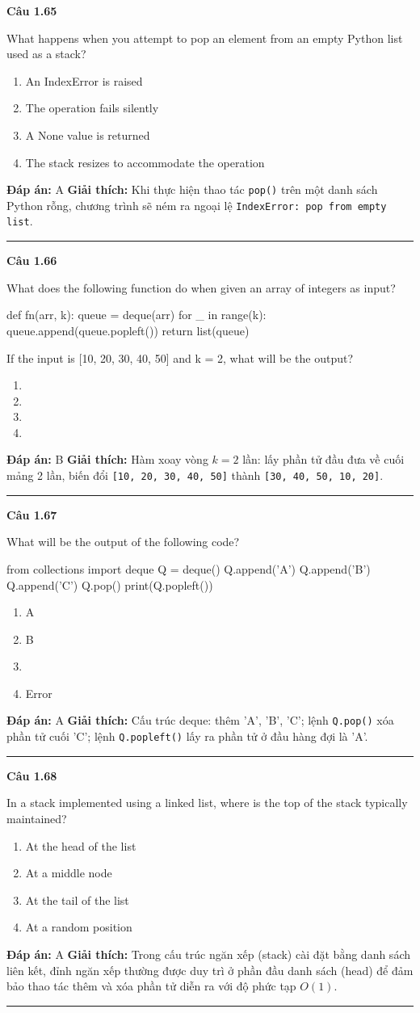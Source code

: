 \documentclass[11pt,a4paper]{article}
\newenvironment{question}[1]{%
  \par\vspace{1em}\noindent\textbf{\large Câu #1}\par\vspace{0.4em}
}{%
  \par\vspace{1em}\hrule\vspace{0.6em}
}
\newenvironment{choices}{%
  \begin{enumerate}[label=\textbf{\Alph*.},leftmargin=2.2em,itemsep=2pt,topsep=3pt]
}{%
  \end{enumerate}
}
\newcommand{\choice}{\item}
\newenvironment{codebox}{%
  \begin{tcolorbox}[colback=gray!8!white,colframe=gray!50!black,arc=1.5mm,boxrule=0.6pt,left=3mm,right=3mm,top=2.5mm,bottom=2.5mm]
  \ttfamily\small
}{%
  \end{tcolorbox}
}
\begin{document}
\begin{question}{1.65}
What happens when you attempt to pop an element from an empty Python list used as a stack?
\begin{choices}
\choice An IndexError is raised
\choice The operation fails silently
\choice A None value is returned
\choice The stack resizes to accommodate the operation
\end{choices}
\textbf{Đáp án:} A
\textbf{Giải thích:} Khi thực hiện thao tác \texttt{pop()} trên một danh sách Python rỗng, chương trình sẽ ném ra ngoại lệ \texttt{IndexError: pop from empty list}.
\end{question}

\begin{question}{1.66}
What does the following function do when given an array of integers as input?
\begin{codebox}
def fn(arr, k):
    queue = deque(arr)
    for _ in range(k):
        queue.append(queue.popleft())
    return list(queue)
\end{codebox}
If the input is [10, 20, 30, 40, 50] and k = 2, what will be the output?
\begin{choices}
\choice [40, 50, 10, 20, 30]
\choice [30, 40, 50, 10, 20]
\choice [20, 30, 40, 50, 10]
\choice [50, 10, 20, 30, 40]
\end{choices}
\textbf{Đáp án:} B
\textbf{Giải thích:} Hàm xoay vòng $k = 2$ lần: lấy phần tử đầu đưa về cuối mảng 2 lần, biến đổi \texttt{[10, 20, 30, 40, 50]} thành \texttt{[30, 40, 50, 10, 20]}.
\end{question}

\begin{question}{1.67}
What will be the output of the following code?
\begin{codebox}
from collections import deque
Q = deque()
Q.append('A')
Q.append('B')
Q.append('C')
Q.pop()
print(Q.popleft())
\end{codebox}
\begin{choices}
\choice A
\choice B
\choice [A, B, C]
\choice Error
\end{choices}
\textbf{Đáp án:} A
\textbf{Giải thích:} Cấu trúc deque: thêm 'A', 'B', 'C'; lệnh \texttt{Q.pop()} xóa phần tử cuối 'C'; lệnh \texttt{Q.popleft()} lấy ra phần tử ở đầu hàng đợi là 'A'.
\end{question}

\begin{question}{1.68}
In a stack implemented using a linked list, where is the top of the stack typically maintained?
\begin{choices}
\choice At the head of the list
\choice At a middle node
\choice At the tail of the list
\choice At a random position
\end{choices}
\textbf{Đáp án:} A
\textbf{Giải thích:} Trong cấu trúc ngăn xếp (stack) cài đặt bằng danh sách liên kết, đỉnh ngăn xếp thường được duy trì ở phần đầu danh sách (head) để đảm bảo thao tác thêm và xóa phần tử diễn ra với độ phức tạp $O(1)$.
\end{question}
\end{document}
